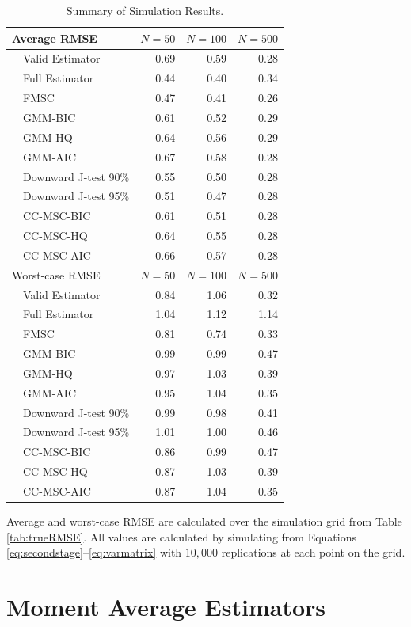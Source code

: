 \documentclass[12pt]{article}
\theoremstyle{definition}
\begin{document}
%
\begin{table}[!tbp]
\caption{Summary of Simulation Results.}
\label{tab:summary}
 \begin{center}
 \begin{tabular}{rlrrr}\hline\hline
\multicolumn{2}{l}{Average RMSE}&\multicolumn{1}{c}{$N=50$}&\multicolumn{1}{c}{$N=100$}&\multicolumn{1}{c}{$N=500$}\tabularnewline
\hline
&Valid Estimator&0.69&0.59&0.28\tabularnewline
&Full Estimator&0.44&0.40&0.34\tabularnewline
&FMSC&0.47&0.41&0.26\tabularnewline
&GMM-BIC&0.61&0.52&0.29\tabularnewline
&GMM-HQ&0.64&0.56&0.29\tabularnewline
&GMM-AIC&0.67&0.58&0.28\tabularnewline
&Downward J-test 90\%&0.55&0.50&0.28\tabularnewline
&Downward J-test 95\%&0.51&0.47&0.28\tabularnewline
&CC-MSC-BIC&0.61&0.51&0.28\tabularnewline
&CC-MSC-HQ&0.64&0.55&0.28\tabularnewline
&CC-MSC-AIC&0.66&0.57&0.28\tabularnewline
\hline\hline
\multicolumn{2}{l}{Worst-case RMSE}&\multicolumn{1}{c}{$N=50$}&\multicolumn{1}{c}{$N=100$}&\multicolumn{1}{c}{$N=500$}\tabularnewline
\hline
&Valid Estimator&0.84&1.06&0.32\tabularnewline
&Full Estimator&1.04&1.12&1.14\tabularnewline
&FMSC&0.81&0.74&0.33\tabularnewline
&GMM-BIC&0.99&0.99&0.47\tabularnewline
&GMM-HQ&0.97&1.03&0.39\tabularnewline
&GMM-AIC&0.95&1.04&0.35\tabularnewline
&Downward J-test 90\%&0.99&0.98&0.41\tabularnewline
&Downward J-test 95\%&1.01&1.00&0.46\tabularnewline
&CC-MSC-BIC&0.86&0.99&0.47\tabularnewline
&CC-MSC-HQ&0.87&1.03&0.39\tabularnewline
&CC-MSC-AIC&0.87&1.04&0.35\tabularnewline
\hline
\end{tabular}
\end{center}
\footnotesize
\begin{tablenotes}
	\item Average and worst-case RMSE are calculated over the simulation grid from Table \ref{tab:trueRMSE}. All values are calculated by simulating from Equations \ref{eq:secondstage}--\ref{eq:varmatrix} with $10,000$ replications at each point on the grid.
\end{tablenotes}
\end{table}







\section{Moment Average Estimators}
\label{sec:avg}
\end{document}
